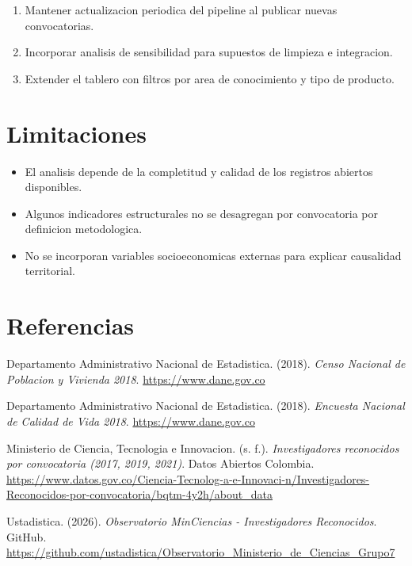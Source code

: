 \documentclass[12pt,letterpaper]{article}
\begin{document}
\begin{enumerate}[label=\arabic*.]
  \item Mantener actualizacion periodica del pipeline al publicar nuevas convocatorias.
  \item Incorporar analisis de sensibilidad para supuestos de limpieza e integracion.
  \item Extender el tablero con filtros por area de conocimiento y tipo de producto.
\end{enumerate}

\section{Limitaciones}

\begin{itemize}
  \item El analisis depende de la completitud y calidad de los registros abiertos disponibles.
  \item Algunos indicadores estructurales no se desagregan por convocatoria por definicion metodologica.
  \item No se incorporan variables socioeconomicas externas para explicar causalidad territorial.
\end{itemize}

\section{Referencias}

Departamento Administrativo Nacional de Estadistica. (2018). \textit{Censo Nacional de Poblacion y Vivienda 2018}. \url{https://www.dane.gov.co}

Departamento Administrativo Nacional de Estadistica. (2018). \textit{Encuesta Nacional de Calidad de Vida 2018}. \url{https://www.dane.gov.co}

Ministerio de Ciencia, Tecnologia e Innovacion. (s. f.). \textit{Investigadores reconocidos por convocatoria (2017, 2019, 2021)}. Datos Abiertos Colombia. \url{https://www.datos.gov.co/Ciencia-Tecnolog-a-e-Innovaci-n/Investigadores-Reconocidos-por-convocatoria/bqtm-4y2h/about_data}

Ustadistica. (2026). \textit{Observatorio MinCiencias - Investigadores Reconocidos}. GitHub. \url{https://github.com/ustadistica/Observatorio_Ministerio_de_Ciencias_Grupo7}
\end{document}

